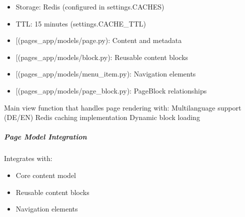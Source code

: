 \documentclass[letterpaper,10pt,english]{sphinxmanual}
\begin{document}
\begin{fulllineitems}
\begin{description}
\begin{itemize}
\item {} 
\sphinxAtStartPar
Storage: Redis (configured in settings.CACHES)

\item {} 
\sphinxAtStartPar
TTL: 15 minutes (settings.CACHE\_TTL)

\end{itemize}

\begin{itemize}
\item {} 
\sphinxAtStartPar
{[}\sphinxtitleref{Page}{]}(pages\_app/models/page.py): Content and metadata

\item {} 
\sphinxAtStartPar
{[}\sphinxtitleref{Block}{]}(pages\_app/models/block.py): Reusable content blocks

\item {} 
\sphinxAtStartPar
{[}\sphinxtitleref{MenuItem}{]}(pages\_app/models/menu\_item.py): Navigation elements

\item {} 
\sphinxAtStartPar
{[}\sphinxtitleref{PageBlock}{]}(pages\_app/models/page\_block.py): Page\sphinxhyphen{}Block relationships

\end{itemize}

\end{description}

\end{fulllineitems}


\sphinxAtStartPar
Main view function that handles page rendering with:
\sphinxhyphen{} Multi\sphinxhyphen{}language support (DE/EN)
\sphinxhyphen{} Redis caching implementation
\sphinxhyphen{} Dynamic block loading


\subparagraph{Page Model Integration}
\label{\detokenize{views/page:page-model-integration}}
\sphinxAtStartPar
Integrates with:
\begin{itemize}
\item {} 
\sphinxAtStartPar
{\hyperref[\detokenize{pages_app.models:pages_app.models.Page}]{}} \sphinxhyphen{} Core content model

\item {} 
\sphinxAtStartPar
{\hyperref[\detokenize{pages_app.models:pages_app.models.Block}]{}} \sphinxhyphen{} Reusable content blocks

\item {} 
\sphinxAtStartPar
{\hyperref[\detokenize{pages_app.models:pages_app.models.MenuItem}]{}} \sphinxhyphen{} Navigation elements

\end{itemize}
\end{document}
